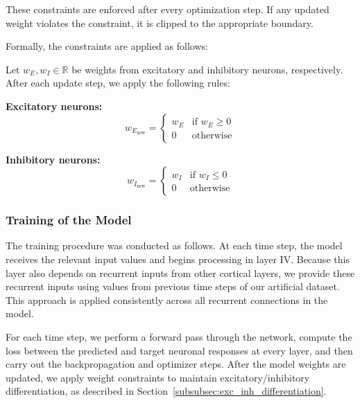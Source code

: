 These constraints are enforced after every optimization step. If any updated weight violates the constraint, it is clipped to the appropriate boundary.

Formally, the constraints are applied as follows:

\begin{defn}
    Let $w_E, w_I \in \mathbb{R}$ be weights from excitatory and inhibitory neurons, respectively. After each update step, we apply the following rules:
    
    \textbf{Excitatory neurons:}
    \begin{equation*}
        w_{E_{\text{new}}} =
        \begin{cases}
            w_E & \text{if } w_E \geq 0 \\
            0 & \text{otherwise}
        \end{cases}
    \end{equation*}
    
    \textbf{Inhibitory neurons:}
    \begin{equation*}
        w_{I_{\text{new}}} =
        \begin{cases}
            w_I & \text{if } w_I \leq 0 \\
            0 & \text{otherwise}
        \end{cases}
    \end{equation*}
\end{defn}
\label{def:weight_constraints}


\subsubsection{Training of the Model}
\label{subsubsec:training_model}

The training procedure was conducted as follows. At each time step, the model receives the relevant input values and begins processing in layer IV. Because this layer also depends on recurrent inputs from other cortical layers, we provide these recurrent inputs using values from previous time steps of our artificial dataset. This approach is applied consistently across all recurrent connections in the model.

For each time step, we perform a forward pass through the network, compute the loss between the predicted and target neuronal responses at every layer, and then carry out the backpropagation and optimizer steps. After the model weights are updated, we apply weight constraints to maintain excitatory/inhibitory differentiation, as described in Section~\ref{subsubsec:exc_inh_differentiation}.

